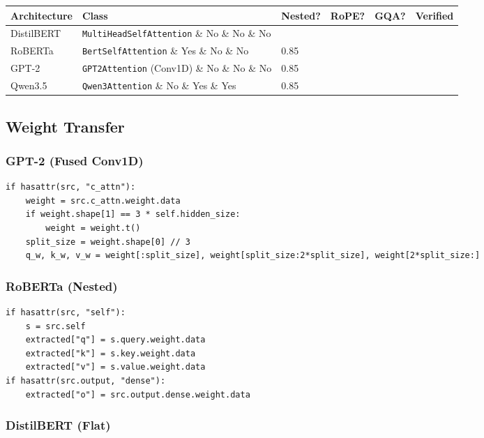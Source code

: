 \begin{table}[H]
\centering
\small
\begin{tabular}{llllll}
\toprule
\textbf{Architecture} & \textbf{Class} & \textbf{Nested?} & \textbf{RoPE?} & \textbf{GQA?} & \textbf{Verified} \\
\midrule
DistilBERT & \texttt{MultiHeadSelfAttention} \& No \& No \& No &  \\
RoBERTa & \texttt{BertSelfAttention} \& Yes \& No \& No & 0.85 \\
GPT-2 & \texttt{GPT2Attention} (Conv1D) \& No \& No \& No & 0.85 \\
Qwen3.5 & \texttt{Qwen3Attention} \& No \& Yes \& Yes & 0.85 \\
\bottomrule
\end{tabular}
\end{table}

\subsection{Weight Transfer}

\subsubsection{GPT-2 (Fused Conv1D)}

\begin{lstlisting}
if hasattr(src, "c_attn"):
    weight = src.c_attn.weight.data
    if weight.shape[1] == 3 * self.hidden_size:
        weight = weight.t()
    split_size = weight.shape[0] // 3
    q_w, k_w, v_w = weight[:split_size], weight[split_size:2*split_size], weight[2*split_size:]
\end{lstlisting}

\subsubsection{RoBERTa (Nested)}

\begin{lstlisting}
if hasattr(src, "self"):
    s = src.self
    extracted["q"] = s.query.weight.data
    extracted["k"] = s.key.weight.data
    extracted["v"] = s.value.weight.data
if hasattr(src.output, "dense"):
    extracted["o"] = src.output.dense.weight.data
\end{lstlisting}

\subsubsection{DistilBERT (Flat)}


